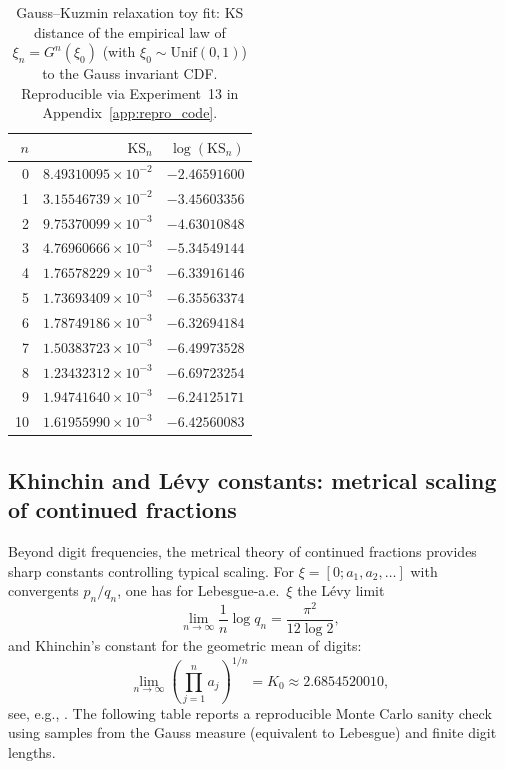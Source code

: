 \begin{table}[H]
\centering
\begin{tabular}{rrr}
\toprule
$n$ & $\mathrm{KS}_n$ & $\log(\mathrm{KS}_n)$ \\
\midrule
0  & $8.49310095\times 10^{-2}$ & $-2.46591600$ \\
1  & $3.15546739\times 10^{-2}$ & $-3.45603356$ \\
2  & $9.75370099\times 10^{-3}$ & $-4.63010848$ \\
3  & $4.76960666\times 10^{-3}$ & $-5.34549144$ \\
4  & $1.76578229\times 10^{-3}$ & $-6.33916146$ \\
5  & $1.73693409\times 10^{-3}$ & $-6.35563374$ \\
6  & $1.78749186\times 10^{-3}$ & $-6.32694184$ \\
7  & $1.50383723\times 10^{-3}$ & $-6.49973528$ \\
8  & $1.23432312\times 10^{-3}$ & $-6.69723254$ \\
9  & $1.94741640\times 10^{-3}$ & $-6.24125171$ \\
10 & $1.61955990\times 10^{-3}$ & $-6.42560083$ \\
\bottomrule
\end{tabular}
\caption{Gauss--Kuzmin relaxation toy fit: KS distance of the empirical law of $\xi_n=G^n(\xi_0)$ (with $\xi_0\sim \mathrm{Unif}(0,1)$) to the Gauss invariant CDF. Reproducible via Experiment~13 in Appendix~\ref{app:repro_code}.}
\label{tab:gauss_kuzmin_fit}
\end{table}

\subsection{Khinchin and L\'evy constants: metrical scaling of continued fractions}
\label{app:quant_fits_khinchin_levy}

Beyond digit frequencies, the metrical theory of continued fractions provides sharp constants controlling typical scaling. For $\xi=[0;a_1,a_2,\ldots]$ with convergents $p_n/q_n$, one has for Lebesgue-a.e.\ $\xi$ the L\'evy limit
\begin{equation}
\lim_{n\to\infty}\frac{1}{n}\log q_n = \frac{\pi^2}{12\log 2},
\end{equation}
and Khinchin's constant for the geometric mean of digits:
\begin{equation}
\lim_{n\to\infty}\left(\prod_{j=1}^n a_j\right)^{1/n}=K_0\approx 2.6854520010,
\end{equation}
see, e.g., \cite{IosifescuKraaikamp2002}. The following table reports a reproducible Monte Carlo sanity check using samples from the Gauss measure (equivalent to Lebesgue) and finite digit lengths.

